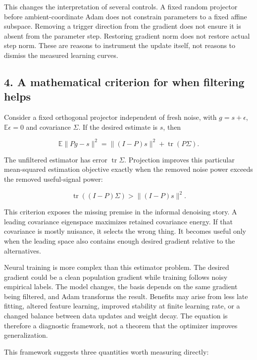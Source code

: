 \documentclass[
  british,
  10pt,
  a4paper,
]{article}
\begin{document}
This changes the interpretation of several controls. A fixed random
projector before ambient-\allowbreak{}coordinate Adam does not constrain
parameters to a fixed affine subspace. Removing a trigger direction from
the gradient does not ensure it is absent from the parameter step.
Restoring gradient norm does not restore actual step norm. These are
reasons to instrument the update itself, not reasons to dismiss the
measured learning curves.

\subsection{4. A mathematical criterion for when filtering
helps}\label{synthesis--a-mathematical-criterion-for-when-filtering-helps}

Consider a fixed orthogonal projector independent of fresh noise, with
\(g=s+\epsilon\), \(\mathbb{E}\epsilon=0\) and covariance \(\Sigma\). If
the desired estimate is \(s\), then

\[
\mathbb{E}\|Pg-s\|^2
=\|(I-P)s\|^2+\operatorname{tr}(P\Sigma).
\]

The unfiltered estimator has error \(\operatorname{tr}\Sigma\).
Projection improves this particular mean-\allowbreak{}squared estimation
objective exactly when the removed noise power exceeds the removed
useful-\allowbreak{}signal power:

\[
\operatorname{tr}((I-P)\Sigma)>\|(I-P)s\|^2.
\]

This criterion exposes the missing premise in the informal denoising
story. A leading covariance eigenspace maximizes retained covariance
energy. If that covariance is mostly nuisance, it selects the wrong
thing. It becomes useful only when the leading space also contains
enough desired gradient relative to the
alternatives\allowbreak{}.\allowbreak{}

Neural training is more complex than this estimator problem. The desired
gradient could be a clean population gradient while training follows
noisy empirical labels. The model changes, the basis depends on the same
gradient being filtered, and Adam transforms the result. Benefits may
arise from less late fitting, altered feature learning, improved
stability at finite learning rate, or a changed balance between data
updates and weight decay. The equation is therefore a diagnostic
framework, not a theorem that the optimizer improves
generalizati\allowbreak{}on.\allowbreak{}

This framework suggests three quantities worth measuring directly:
\end{document}
